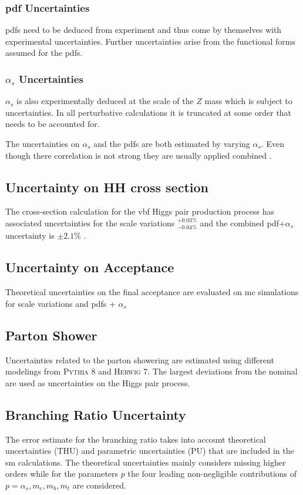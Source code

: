 \subsubsection*{\ac{pdf} Uncertainties}
\acp{pdf} need to be deduced from experiment and thus come by themselves with experimental uncertainties. Further uncertainties arise from the functional forms assumed for the \acp{pdf}.

\subsubsection*{$\alpha_s$ Uncertainties}
$\alpha_s$ is also experimentally deduced at the scale of the $Z$ mass which is subject to uncertainties. In all perturbative calculations it is truncated at some order that needs to be accounted for. 

The uncertainties on $\alpha_s$ and the \acp{pdf} are both estimated by varying $\alpha_s$. Even though there correlation is not strong they are usually applied combined \citep{unc_recipe}.

\subsection{Uncertainty on HH cross section}
The cross-section calculation for the \ac{vbf} Higgs pair production process has associated uncertainties for the scale variations $^{+0.03\%}_{-0.04\%}$ and the combined \ac{pdf}+$\alpha_s$ uncertainty is $\pm 2.1\%$ \citep{de2016arxiv}. 

\subsection{Uncertainty on Acceptance}
Theoretical uncertainties on the final acceptance are evaluated on \ac{mc} simulations for scale variations and \acp{pdf} + $\alpha_s$  

\subsection{Parton Shower}
Uncertainties related to the parton showering are estimated using different modelings from \textsc{Pythia 8} and \textsc{Herwig 7}. The largest deviations from the nominal are used as uncertainties on the Higgs pair process. 


\subsection{Branching Ratio Uncertainty}
The error estimate for the branching ratio takes into account theoretical uncertainties (THU) and parametric uncertainties (PU) that are included in the \ac{sm} calculations. The theoretical uncertainties mainly considers missing higher orders while for the parameters $p$ the four leading non-negligible contributions of $p=\alpha_s,m_c,m_b,m_t$ are considered.

